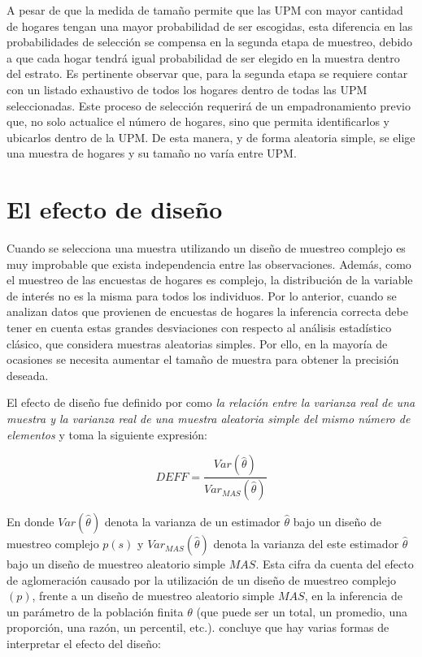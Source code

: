 \documentclass[
  12pt,
]{book}
\begin{document}
A pesar de que la medida de tamaño permite que las UPM con mayor cantidad de hogares tengan una mayor probabilidad de ser escogidas, esta diferencia en las probabilidades de selección se compensa en la segunda etapa de muestreo, debido a que cada hogar tendrá igual probabilidad de ser elegido en la muestra dentro del estrato. Es pertinente observar que, para la segunda etapa se requiere contar con un listado exhaustivo de todos los hogares dentro de todas las UPM seleccionadas. Este proceso de selección requerirá de un empadronamiento previo que, no solo actualice el número de hogares, sino que permita identificarlos y ubicarlos dentro de la UPM. De esta manera, y de forma aleatoria simple, se elige una muestra de hogares y su tamaño no varía entre UPM.

\hypertarget{el-efecto-de-diseuxf1o}{%
\chapter{El efecto de diseño}\label{el-efecto-de-diseuxf1o}}

Cuando se selecciona una muestra utilizando un diseño de muestreo complejo es muy improbable que exista independencia entre las observaciones. Además, como el muestreo de las encuestas de hogares es complejo, la distribución de la variable de interés no es la misma para todos los individuos. Por lo anterior, cuando se analizan datos que provienen de encuestas de hogares la inferencia correcta debe tener en cuenta estas grandes desviaciones con respecto al análisis estadístico clásico, que considera muestras aleatorias simples. Por ello, en la mayoría de ocasiones se necesita aumentar el tamaño de muestra para obtener la precisión deseada.

El efecto de diseño fue definido por \citet[página 258]{Kish_1965} como \emph{la relación entre la varianza real de una muestra y la varianza real de una muestra aleatoria simple del mismo número de elementos} y toma la siguiente expresión:

\[
DEFF=\frac{Var(\hat{\theta})}{Var_{MAS}(\hat{\theta})}
\]

En donde \(Var(\hat{\theta})\) denota la varianza de un estimador \(\hat{\theta}\) bajo un diseño de muestreo complejo \(p(s)\) y \(Var_{MAS}(\hat{\theta})\) denota la varianza del este estimador \(\hat{\theta}\) bajo un diseño de muestreo aleatorio simple \(MAS\). Esta cifra da cuenta del efecto de aglomeración causado por la utilización de un diseño de muestreo complejo \((p)\), frente a un diseño de muestreo aleatorio simple \(MAS\), en la inferencia de un parámetro de la población finita \(\theta\) (que puede ser un total, un promedio, una proporción, una razón, un percentil, etc.). \citet[p.~49]{United_Nations_2008} concluye que hay varias formas de interpretar el efecto del diseño:
\end{document}
